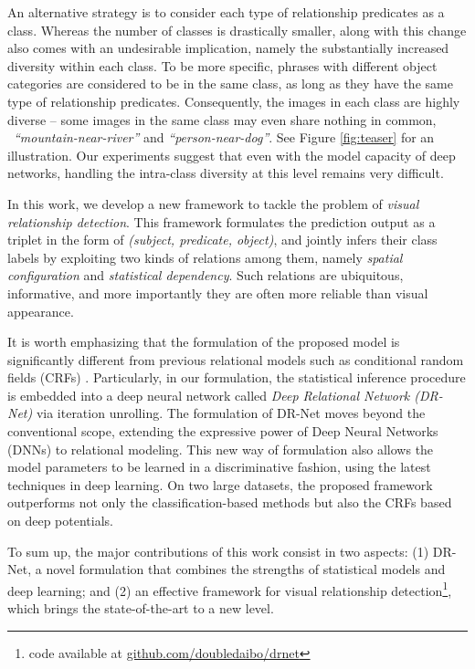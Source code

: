 \documentclass[10pt,twocolumn,letterpaper]{article}
\begin{document}
An alternative strategy is to consider each type of relationship predicates
as a class. Whereas the number of classes is drastically smaller,
along with this change also comes with an undesirable 
implication, namely the substantially increased diversity within each class.
%
To be more specific, phrases with different object categories
are considered to be in the same class, as long as they have 
the same type of relationship predicates.
Consequently, the images in each class are highly diverse --
some images in the same class may even share nothing in common,
\eg~\emph{``mountain-near-river''} and \emph{``person-near-dog''}.
See Figure \ref{fig:teaser} for an illustration.
%
Our experiments suggest that even with the model capacity of deep networks,
handling the intra-class diversity at this level remains very difficult.

In this work, we develop a new framework to tackle the problem 
of \emph{visual relationship detection}.
%
This framework formulates the prediction output as a triplet
in the form of \emph{(subject, predicate, object)}, and
jointly infers their class labels by exploiting 
two kinds of relations among them, namely
\emph{spatial configuration} and \emph{statistical dependency}.
Such relations are ubiquitous, informative, and more importantly
they are often more reliable than visual appearance.

It is worth emphasizing that the formulation of the proposed model
is significantly different from previous relational models such as
conditional random fields (CRFs) \cite{lafferty2001conditional}. 
Particularly, in our formulation, the statistical inference procedure
is embedded into a deep neural network 
called \emph{Deep Relational Network (DR-Net)} via iteration unrolling.
%
The formulation of DR-Net moves beyond the conventional scope, extending
the expressive power of Deep Neural Networks (DNNs) to relational modeling.
This new way of formulation also allows the model parameters to be learned 
in a discriminative fashion, using the latest techniques in deep learning.  
%
On two large datasets, the proposed framework outperforms not only 
the classification-based methods but also the CRFs based on deep potentials.

To sum up, the major contributions of this work consist in two aspects:
(1) DR-Net, a novel formulation that combines the strengths of statistical
models and deep learning; and
(2) an effective framework for visual relationship detection\footnote{code available at \url{github.com/doubledaibo/drnet}}, 
which brings the state-of-the-art to a new level.
\end{document}
